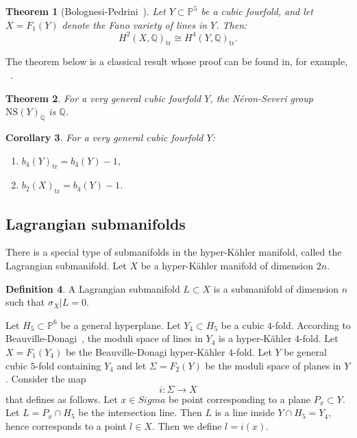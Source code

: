 \documentclass{article}
\newtheorem{theorem}{Theorem}[section]
\newtheorem{corollary}[theorem]{Corollary}
\theoremstyle{definition}
\newtheorem{definition}[theorem]{Definition}
\begin{document}
\begin{theorem}[Bolognesi-Pedrini~\cite{Bolognesi}]
Let \( Y \subset \mathbb{P}^5 \) be a cubic fourfold, and let \( X = F_1(Y) \) denote the Fano variety of lines in \( Y \). Then:
\[
H^2(X, \mathbb{Q})_{\mathrm{tr}} \cong H^4(Y, \mathbb{Q})_{\mathrm{tr}}.
\]
\end{theorem}
The theorem below is a classical result whose proof can be found in, for example, ~\cite[IV, Corollary 3.3]{Hartshorne}.
\begin{theorem}
For a very general cubic fourfold \( Y \), the Néron-Severi group \( \mathrm{NS}(Y)_\mathbb{Q} \) is \( \mathbb{Q} \).
\end{theorem}

\begin{corollary}\label{CorTranscendental}
For a very general cubic fourfold \( Y \):
\begin{enumerate}
    \item \( b_4(Y)_{\mathrm{tr}} = b_4(Y) - 1 \), 
    \item \( b_2(X)_{\mathrm{tr}} = b_4(Y) - 1 \).
\end{enumerate}
\end{corollary}


\subsection{Lagrangian submanifolds}

There is a special type of submanifolds in the hyper-Kähler manifold, called the Lagrangian submanifold. Let $X$ be a hyper-Kähler manifold of dimension $2n$.

\begin{definition}
    A Lagrangian submanifold $L\subset X$ is a submanifold of dimension $n$ such that $\sigma_X|L = 0$.
\end{definition}



Let $H_5\subset \mathbb P^6$ be a general hyperplane. Let $Y_4\subset H_5$ be a cubic $4$-fold. According to Beauville-Donagi~\cite{BD}, the moduli space of lines in $Y_4$ is a hyper-Kähler $4$-fold. Let $X = F_1(Y_4)$ be the Beauville-Donagi hyper-Kähler $4$-fold. Let $Y$ be general cubic $5$-fold containing $Y_4$ and let $\Sigma = F_2(Y)$ be the moduli space of planes in $Y$. Consider the map
\[
i: \Sigma \to X
\]
that defines as follows. Let $x\in Sigma$ be point corresponding to a plane $P_x\subset Y$. Let $L = P_x\cap H_5$ be the intersection line. Then $L$ is a line inside $Y\cap H_5 = Y_4$, hence corresponds to a point $l\in X$. Then we define $l = i(x)$.
\end{document}
